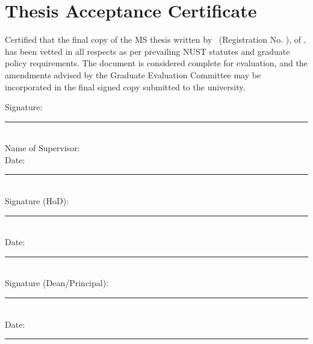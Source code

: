 \chapter*{Thesis Acceptance Certificate}
\thispagestyle{empty}
\begin{justify}
Certified that the final copy of the MS thesis written by \StudentName\ (Registration No. \RegistrationNo), of \SchoolName, has been vetted in all respects as per prevailing NUST statutes and graduate policy requirements. The document is considered complete for evaluation, and the amendments advised by the Graduate Evaluation Committee may be incorporated in the final signed copy submitted to the university.
\end{justify}
\vspace{1.2cm}
\begin{flushright}
Signature: \rule{6cm}{0.4pt}\\[0.5cm]
Name of Supervisor: \SupervisorName\\[0.5cm]
Date: \rule{6cm}{0.4pt}\\[0.9cm]
Signature (HoD): \rule{6cm}{0.4pt}\\[0.5cm]
Date: \rule{6cm}{0.4pt}\\[0.9cm]
Signature (Dean/Principal): \rule{6cm}{0.4pt}\\[0.5cm]
Date: \rule{6cm}{0.4pt}
\end{flushright}
\clearpage
